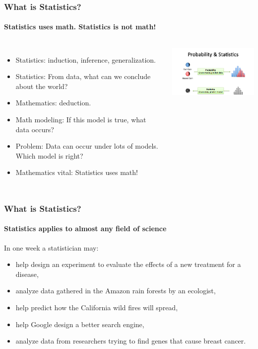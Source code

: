 \documentclass[
10pt]{beamer}
\begin{document}
\begin{frame}
\frametitle{What is Statistics?}
\framesubtitle{Statistics uses math.  Statistics is not math!}
\begin{columns}[c]
\column{2.2in}

\begin{itemize}
\item Statistics: induction, inference, generalization.
\item Statistics: From data, what can we conclude about the world?
\item Mathematics: deduction.
\item Math modeling: If this model is true, what data occurs?
\item Problem: Data can occur under lots of models.  Which model is right?
\item Mathematics vital: Statistics uses math!
\end{itemize}
\column{3.5in}
  \includegraphics[width=2.5in]{figs/probability_vs_stats.png}\\
\end{columns}

\end{frame}

\begin{frame}
      \frametitle{What is Statistics?}
      \framesubtitle{Statistics applies to almost any field of science} 
      
      In one week a statistician may: \pause

       \begin{itemize}%
           \item help design an experiment to evaluate the effects of a new treatment for a
           disease, \pause
           \item analyze data gathered in the Amazon rain forests by an ecologist, \pause
           \item help predict how the California wild fires will
           spread, \pause
           \item help Google design a better search engine, \pause
           \item analyze data from researchers trying to find
           genes that cause breast cancer.
           \end{itemize}
 \end{frame}
\end{document}
